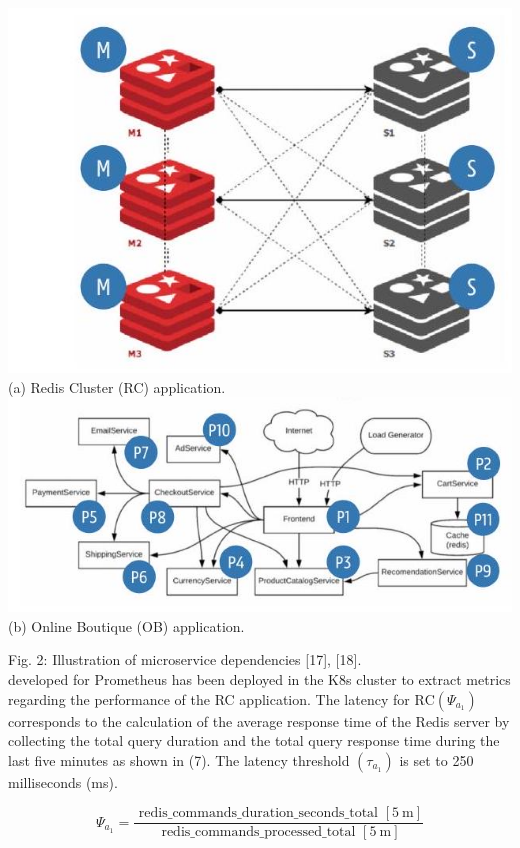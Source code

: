 \documentclass[10pt]{article}
\begin{document}
\includegraphics[max width=\textwidth, center]{2024_11_17_21ad14b6196e5740bf69g-6(1)}\\
(a) Redis Cluster (RC) application.\\
\includegraphics[max width=\textwidth, center]{2024_11_17_21ad14b6196e5740bf69g-6}\\
(b) Online Boutique (OB) application.

Fig. 2: Illustration of microservice dependencies [17], [18].\\
developed for Prometheus has been deployed in the K8s cluster to extract metrics regarding the performance of the RC application. The latency for $\mathrm{RC}\left(\Psi_{a_{1}}\right)$ corresponds to the calculation of the average response time of the Redis server by collecting the total query duration and the total query response time during the last five minutes as shown in (7). The latency threshold $\left(\tau_{a_{1}}\right)$ is set to 250 milliseconds (ms).


\begin{equation*}
\Psi_{a_{1}}=\frac{\text { redis_commands_duration_seconds_total }[5 \mathrm{~m}]}{\text { redis_commands_processed_total }[5 \mathrm{~m}]} \tag{7}
\end{equation*}
\end{document}
